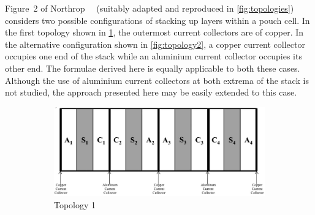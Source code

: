 Figure~2 of Northrop~\etal~\cite{Northrop2011}  (suitably adapted and reproduced
in \cref{fig:topologies})  considers two possible configurations  of stacking up
layers within a pouch cell. In the first topology shown in \cref{fig:topology1},
the outermost current collectors are of copper. In the alternative configuration
shown in  \cref{fig:topology2}, a copper  current collector occupies one  end of
the  stack while  an aluminium  current collector  occupies its  other end.  The
formulae derived  here is equally applicable  to both these cases.  Although the
use of aluminium current collectors at both extrema of the stack is not studied,
the approach presented here may be easily extended to this case.

\begin{figure}[!htbp]
    \centering
    \begin{subfigure}[b]{0.725\textwidth}
        \includegraphics[width=\linewidth]{chapters/layer_opt/figures/layer_stack2}
        \caption{Topology 1}
        \label{fig:topology1}
    \end{subfigure}
    \hfill
    \begin{subfigure}[b]{0.225\textwidth}

\end{subfigure}
\end{figure}
